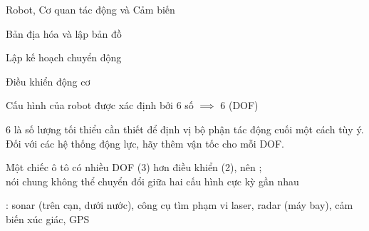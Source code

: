 \documentclass{article}
\begin{document}
\begin{huge}

\sf


Robot, Cơ quan tác động và Cảm biến

Bản địa hóa và lập bản đồ

Lập kế hoạch chuyển động

Điều khiển động cơ


\centerline{  \qquad {} }

\centerline{  \qquad {} }



\vspace*{0.2in}

\textwidth
{}

Cấu hình của robot được xác định bởi 6 số\al
$\implies$ 6  (DOF)

6 là số lượng tối thiểu cần thiết để định vị bộ phận tác động cuối một cách tùy ý.\\
Đối với các hệ thống động lực, hãy thêm vận tốc cho mỗi DOF.



\vspace*{0.2in}

\textwidth
{}

Một chiếc ô tô có nhiều DOF (3) hơn điều khiển (2), nên ;\\
nói chung không thể chuyển đổi giữa hai cấu hình cực kỳ gần nhau



: sonar (trên cạn, dưới nước), công cụ tìm phạm vi laser, radar (máy bay),
cảm biến xúc giác, GPS

\vspace*{0.2in}


\end{huge}
\end{document}
